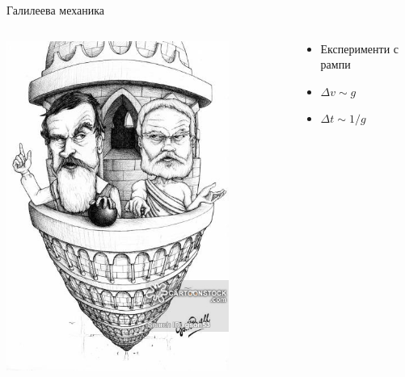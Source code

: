 \documentclass[10pt,a4paper]{beamer}
\begin{document}
        \begin{frame}{ Галилеева механика }
            \begin{columns}
                \begin{column}{0.5\textwidth}
                    \includegraphics[width=0.8\textwidth]{images/galilei_aristotle_piza.jpg}
                \end{column}
                \begin{column}{0.5\textwidth}
                    \begin{itemize}
                        \item Експерименти с рампи
                        \item $ \Delta v \sim g $
                        \item $ \Delta t \sim 1/g $
                    \end{itemize}
                \end{column}
            \end{columns}
        \end{frame}
    
\end{document}
